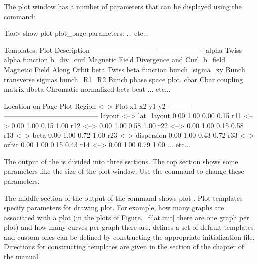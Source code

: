 \documentclass{hitec}
\begin{document}
The plot window has a number of parameters that can be displayed using the 
command:

\begin{code}
Tao> show plot
plot_page parameters:
... etc...

Templates:
   Plot                                    Description
   ----------------------------            -------------------
   alpha                                   Twiss alpha function
   b_div_curl                              Magnetic Field Divergence and Curl.
   b_field                                 Magnetic Field Along Orbit
   beta                                    Twiss beta function
   bunch_sigma_xy                          Bunch transverse sigmas
   bunch_R1_R2                             Bunch phase space plot.
   cbar                                    Cbar coupling matrix
   dbeta                                   Chromatic normalized beta beat
... etc...

                                               Location on Page
Plot Region         <-->  Plot                 x1    x2    y1    y2
-----------               -----------------------------------------
layout              <-->  lat_layout          0.00  1.00  0.00  0.15
r11                 <-->                      0.00  1.00  0.15  1.00
r12                 <-->                      0.00  1.00  0.58  1.00
r22                 <-->                      0.00  1.00  0.15  0.58
r13                 <-->  beta                0.00  1.00  0.72  1.00
r23                 <-->  dispersion          0.00  1.00  0.43  0.72
r33                 <-->  orbit               0.00  1.00  0.15  0.43
r14                 <-->                      0.00  1.00  0.79  1.00
... etc...
\end{code}
The output of the  is divided into three sections. The top section
shows some parameters like the size of the plot window. Use the 
command to change these parameters. 

The middle section of the output of the  command shows plot .
Plot templates specify parameters for drawing plot. For example, how many graphs are
associated with a plot (in the plots of Figure.~\ref{f:lat.init} there are one graph per plot)
and how many curves per graph there are. \tao defines a set of default templates and custom
ones can be defined by constructing the appropriate initialization file. Directions for
constructing templates are given in the  section of the  chapter of the \tao manual.
\end{document}
